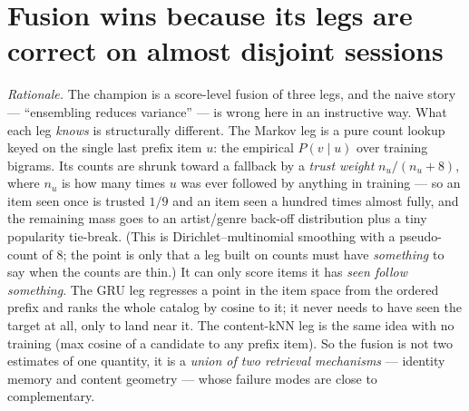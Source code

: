 \documentclass[11pt]{article}
\begin{document}
\clearpage
\section{Fusion wins because its legs are correct on almost disjoint sessions}
\label{sec:fusion}

\emph{Rationale.} The champion is a score-level fusion of three legs, and the
naive story --- ``ensembling reduces variance'' --- is wrong here in an
instructive way. What each leg \emph{knows} is structurally different. The
Markov leg is a pure count lookup keyed on the single last prefix item $u$: the
empirical $P(v\mid u)$ over training bigrams. Its counts are shrunk toward a
fallback by a \emph{trust weight} $n_u/(n_u+8)$, where $n_u$ is how many times $u$
was ever followed by anything in training --- so an item seen once is trusted
$1/9$ and an item seen a hundred times almost fully, and the remaining mass goes
to an artist/genre back-off distribution plus a tiny popularity tie-break. (This
is Dirichlet--multinomial smoothing with a pseudo-count of 8; the point is only
that a leg built on counts must have \emph{something} to say when the counts are
thin.) It can only score items it has \emph{seen follow something}. The GRU leg
regresses a point in the item space from the ordered prefix and ranks the whole
catalog by cosine to it; it never needs to have seen the target at all, only to
land near it. The content-kNN leg is the same idea with no training (max cosine
of a candidate to any prefix item). So the fusion is not two estimates of one
quantity, it is a \emph{union of two retrieval mechanisms} --- identity memory
and content geometry --- whose failure modes are close to complementary.
\end{document}
